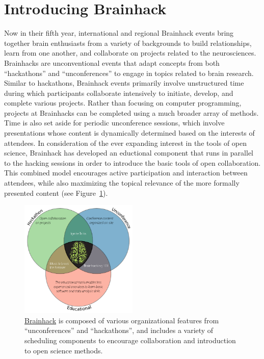 \documentclass[11pt]{bmc_article_s50}
\begin{document}

\section{Introducing Brainhack}

Now in their fifth year, international and regional Brainhack events bring together brain enthusiasts from a variety of backgrounds to build relationships, learn from one another, and collaborate on projects related to the neurosciences. Brainhacks are unconventional events that adapt concepts from both ``hackathons'' and ``unconferences'' to engage in topics related to brain research. Similar to hackathons, Brainhack events primarily involve unstructured time during which participants collaborate intensively to initiate, develop, and complete various projects. Rather than focusing on computer programming, projects at Brainhacks can be completed using a much broader array of methods. Time is also set aside for periodic unconference sessions, which involve presentations whose content is dynamically determined based on the interests of attendees. In consideration of the ever expanding interest in the tools of open science, Brainhack has developed an eductional component that runs in parallel to the hacking sessions in order to introduce the basic tools of open collaboration. This combined model encourages active participation and interaction between attendees, while also maximizing the topical relevance of the more formally presented content (see Figure~\ref{fig1}).

\begin{figure}[htp]
\begin{center}
  \includegraphics[width=0.5\textwidth]{Figure_01}
  \caption{\href{http://www.brainhack.org}{Brainhack} is composed of various organizational features from ``unconferences'' and ``hackathons'', and includes a variety of scheduling components to encourage collaboration and introduction to open science methods.}
  \label{fig1}
\end{center}
\end{figure}
\end{document}
